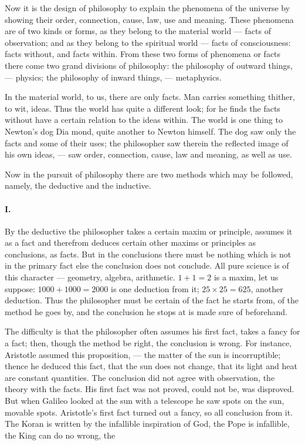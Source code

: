 \documentclass[12pt]{article}
\begin{document}
Now it is the design of philosophy to explain the 
phenomena of the universe by showing their order, 
connection, cause, law, use and meaning. These phenomena are of two kinds or forms, as they belong to 
the material world --- facts of observation; and as they 
belong to the spiritual world --- facts of consciousness: 
facts without, and facts within. From these two forms 
of phenomena or facts there come two grand divisions 
of philosophy: the philosophy of outward things, --- 
physics; the philosophy of inward things, --- metaphysics. 

In the material world, to us, there are only facts. 
Man carries something thither, to wit, ideas. Thus 
the world has quite a different look; for he finds the 
facts without have a certain relation to the ideas 
within. The world is one thing to Newton's dog Dia%
%
mond, quite another to Newton himself. The dog saw 
only the facts and some of their uses; the philosopher 
saw therein the reflected image of his own ideas, --- 
saw order, connection, cause, law and meaning, as well 
as use. 

Now in the pursuit of philosophy there are two methods which may be followed, namely, the deductive and 
the inductive. 

\paragraph{I.} By the deductive the philosopher takes a certain 
maxim or principle, assumes it as a fact and therefrom 
deduces certain other maxims or principles as conclusions, as facts. But in the conclusions there must 
be nothing which is not in the primary fact else the 
conclusion does not conclude. All pure science is of 
this character --- geometry, algebra, arithmetic. $1+1 = 2$ is a maxim, let us suppose: $1000 + 1000 = 2000$ is one deduction from it; $25 {\times} 25 = 625$, another deduction. Thus the philosopher must be certain of the 
fact he starts from, of the method he goes by, and the 
conclusion he stops at is made sure of beforehand. 

The difficulty is that the philosopher often assumes 
his first fact, takes a fancy for a fact; then, though 
the method be right, the conclusion is wrong. For instance, Aristotle assumed this proposition, --- the matter 
of the sun is incorruptible; thence he deduced this fact, 
that the sun does not change, that its light and heat 
are constant quantities. The conclusion did not agree 
with observation, the theory with the facts. His first 
fact was not proved, could not be, was disproved. But 
when Galileo looked at the sun with a telescope he saw 
spots on the sun, movable spots. Aristotle's first fact 
turned out a fancy, so all conclusion from it. The 
Koran is written by the infallible inspiration of God, 
the Pope is infallible, the King can do no wrong, the 
\end{document}
